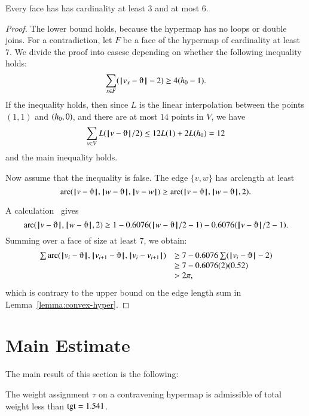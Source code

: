 \begin{lemma}  Every face has has cardinality at least $3$ and at most $6$.
\end{lemma}

\begin{proof} The lower bound holds, because the hypermap has no loops or double joins.  For a contradiction, let $F$ be a face of the hypermap of cardinality at least $7$.  We divide the proof into casese depending on whether the
following inequality holds:
$$
\sum _{x\in F} (\norm{v_x}{\orgn}-2) \ge 4(\hm-1).
$$
If the inequality holds, then since $L$ is the linear interpolation between the points $(1,1)$ and $({h_0},0)$, and there are at most $14$ points in $V$, we have
$$\sum_{v\in V}L(\norm{v}{\orgn}/2) \le 12 L(1) + 2 L(\hm) =12$$
and the main inequality holds.

Now assume that the inequality is false.
The edge $\{v,w\}$ has arclength at least
$$
\arc(\norm{v}{\orgn},\norm{w}{\orgn},\norm{v}{w}) \ge \arc(\norm{v}{\orgn},\norm{w}{\orgn},2). 
$$

A calculation~\cite[cc:arc]{hales:2009:nonlinear} gives
$$\arc(\norm{v}{\orgn},\norm{w}{\orgn},2)\ge 1 - 0.6076 (\norm{w}{\orgn}/2 - 1) - 0.6076 (\norm{v}{\orgn}/2 - 1).$$ %
Summing over a face of size at least $7$, we obtain:
$$
\begin{array}{lll}
\sum \arc(\norm{v_i}{\orgn},\norm{v_{i+1}}{\orgn},\norm{v_i}{v_{i+1}})&\ge
7 - 0.6076 \sum (\norm{v_i}{\orgn}-2) \\
   &\ge 7 - 0.6076 (2) (0.52) \\
   &> 2\pi,
\end{array}
$$
which is contrary to the upper bound on the edge length
sum in Lemma~\ref{lemma:convex-hyper}.
\end{proof}













\section{Main Estimate}\label{sec:weight}


The main result of this section is the following:

\begin{theorem}  The weight assignment $\tau$ on a contravening hypermap is admissible of  total weight less than ${\operatorname{tgt}}=1.541$.
\end{theorem}


